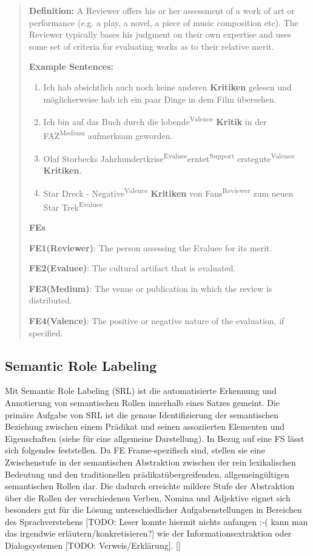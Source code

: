\documentclass[12pt]{article}
\begin{document}
\begin{quote}
\textbf{Definition:}
A Reviewer offers his or her assessment of a work of art or performance (e.g. a play, a novel, a piece of music composition etc). The Reviewer typically bases his judgment on their own expertise and uses some set of criteria for evaluating works as to their relative merit.

\textbf{Example Sentences:}
\begin{enumerate}
\item Ich hab absichtlich auch noch keine anderen \textbf{Kritiken} gelesen und möglicherweise hab ich ein paar Dinge in dem Film übersehen.
\item Ich bin auf das Buch durch die \lbrack lobende\rbrack \textsuperscript{Valence} \textbf{Kritik} \lbrack in der FAZ\rbrack \textsuperscript{Medium} aufmerksam geworden.
\item \lbrack Olaf Storbecks Jahrhundertkrise\rbrack\textsuperscript{Evaluee}\lbrack erntet\rbrack\textsuperscript{Support} erste\lbrack gute\rbrack \textsuperscript{Valence} \textbf{Kritiken}.
\item Star Dreck - \lbrack Negative\rbrack \textsuperscript{Valence} \textbf{Kritiken} \lbrack von Fans\rbrack \textsuperscript{Reviewer}  \lbrack zum neuen Star Trek\rbrack \textsuperscript{Evaluee}
\end{enumerate}


\textbf{FEs}

\textbf{FE1(Reviewer)}: The person assessing the Evaluee for its merit.

\textbf{FE2(Evaluee)}: The cultural artifact that is evaluated.

\textbf{FE3(Medium)}: The venue or publication in which the review is distributed.

\textbf{FE4(Valence)}: The positive or negative nature of the evaluation, if specified. 
\end{quote}

\subsection{Semantic Role Labeling}\label{subsec:introduction_SRL}

Mit Semantic Role Labeling (SRL) ist die automatisierte Erkennung und
Annotierung von semantischen Rollen innerhalb eines Satzes gemeint. Die primäre
Aufgabe von SRL ist die genaue Identifizierung der semantischen Beziehung
zwischen einem Prädikat und seinen assoziierten Elementen und Eigenschaften
(siehe \cite{SRL2008} für eine allgemeine Darstellung). In Bezug auf eine FS lässt
sich folgendes feststellen. Da FE Frame-spezifisch sind, stellen sie eine
Zwischenstufe in der semantischen Abstraktion zwischen der rein lexikalischen
Bedeutung und den traditionellen prädikatübergreifenden, allgemeingültigen semantischen Rollen dar.
Die dadurch erreichte \glqq{}mildere\grqq{} Stufe der Abstraktion über die
Rollen der verschiedenen Verben, Nomina und Adjektive eignet sich besonders gut
für die Lösung unterschiedlicher Aufgabenstellungen in Bereichen des
Sprachverstehens [TODO: Leser konnte hiermit nichts anfangen :-( kann man das irgendwie erläutern/konkretisieren?] wie der Informationsextraktion oder Dialogsystemen [TODO: Verweis/Erklärung]. [\cite{gildea}]
\end{document}
